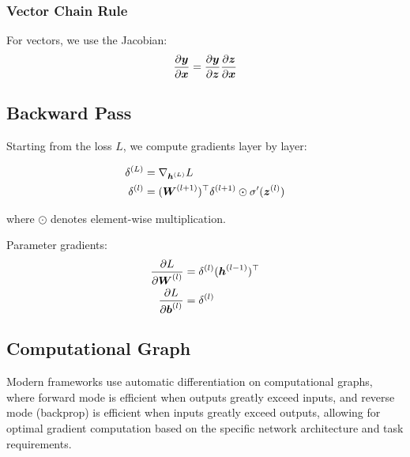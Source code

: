\subsubsection{Vector Chain Rule}

For vectors, we use the Jacobian:
\begin{equation}
\frac{\partial \boldsymbol{y}}{\partial \boldsymbol{x}} = \frac{\partial \boldsymbol{y}}{\partial \boldsymbol{z}} \frac{\partial \boldsymbol{z}}{\partial \boldsymbol{x}}
\end{equation}

\subsection{Backward Pass}

Starting from the loss $L$, we compute gradients layer by layer:

\begin{align}
\delta^{(L)} &= \nabla_{\boldsymbol{h}^{(L)}} L \\
\delta^{(l)} &= (\boldsymbol{W}^{(l+1)})^\top \delta^{(l+1)} \odot \sigma'(\boldsymbol{z}^{(l)})
\end{align}

where $\odot$ denotes element-wise multiplication.

Parameter gradients:
\begin{align}
\frac{\partial L}{\partial \boldsymbol{W}^{(l)}} &= \delta^{(l)} (\boldsymbol{h}^{(l-1)})^\top \\
\frac{\partial L}{\partial \boldsymbol{b}^{(l)}} &= \delta^{(l)}
\end{align}

\subsection{Computational Graph}

Modern frameworks use automatic differentiation on computational graphs, where forward mode is efficient when outputs greatly exceed inputs, and reverse mode (backprop) is efficient when inputs greatly exceed outputs, allowing for optimal gradient computation based on the specific network architecture and task requirements.


